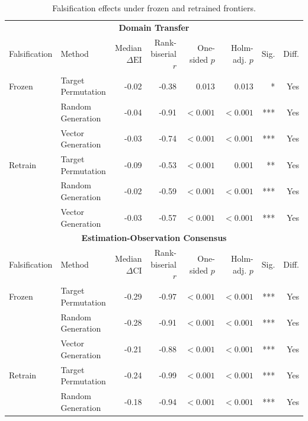 \documentclass{article}
\begin{document}
\clearpage
\begin{table}[H]
\centering
\footnotesize
\captionsetup{position=top,skip=12pt}
\caption{Falsification effects under frozen and retrained frontiers.}
\label{tab:si-falsify}
\setlength{\tabcolsep}{2pt}
\begin{tabularx}{\linewidth}{@{}l>{\raggedright\arraybackslash}Xrrrrrr@{}}
\toprule
\multicolumn{8}{c}{\textbf{Domain Transfer}} \\
\cmidrule(lr){1-8}
Falsification & Method & \shortstack{Median\\$\Delta\mathrm{EI}$} & \shortstack{Rank-biserial\\$r$} & \shortstack{One-sided\\$p$} & \shortstack{Holm-adj.\\$p$} & Sig. & Diff. \\
\midrule
Frozen & Target Permutation & -0.02 & -0.38 & 0.013 & 0.013 & * & Yes \\
 & Random Generation & -0.04 & -0.91 & $<0.001$ & $<0.001$ & *** & Yes \\
 & Vector Generation & -0.03 & -0.74 & $<0.001$ & $<0.001$ & *** & Yes \\
\addlinespace
Retrain & Target Permutation & -0.09 & -0.53 & $<0.001$ & 0.001 & ** & Yes \\
 & Random Generation & -0.02 & -0.59 & $<0.001$ & $<0.001$ & *** & Yes \\
 & Vector Generation & -0.03 & -0.57 & $<0.001$ & $<0.001$ & *** & Yes \\
\midrule
\multicolumn{8}{c}{\textbf{Estimation-Observation Consensus}} \\
\cmidrule(lr){1-8}
Falsification & Method & \shortstack{Median\\$\Delta\mathrm{CI}$} & \shortstack{Rank-biserial\\$r$} & \shortstack{One-sided\\$p$} & \shortstack{Holm-adj.\\$p$} & Sig. & Diff. \\
\midrule
Frozen & Target Permutation & -0.29 & -0.97 & $<0.001$ & $<0.001$ & *** & Yes \\
 & Random Generation & -0.28 & -0.91 & $<0.001$ & $<0.001$ & *** & Yes \\
 & Vector Generation & -0.21 & -0.88 & $<0.001$ & $<0.001$ & *** & Yes \\
\addlinespace
Retrain & Target Permutation & -0.24 & -0.99 & $<0.001$ & $<0.001$ & *** & Yes \\
 & Random Generation & -0.18 & -0.94 & $<0.001$ & $<0.001$ & *** & Yes \\

\end{tabularx}
\end{table}
\end{document}

